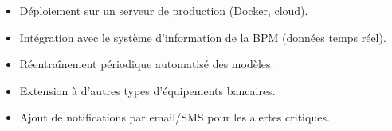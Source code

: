 \documentclass[a4paper,12pt]{report}
\begin{document}
\begin{itemize}
    \item Déploiement sur un serveur de production (Docker, cloud).
    \item Intégration avec le système d'information de la BPM (données temps réel).
    \item Réentraînement périodique automatisé des modèles.
    \item Extension à d'autres types d'équipements bancaires.
    \item Ajout de notifications par email/SMS pour les alertes critiques.
\end{itemize}
\end{document}
